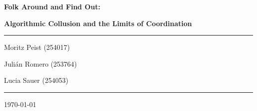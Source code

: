 \documentclass[12pt]{article}
\begin{document}
\begin{titlepage}
	\centering
	\par\vspace{1cm}
	{\huge\bfseries Folk Around and Find Out:\par}
    {\large\bfseries Algorithmic Collusion and the Limits of Coordination\par}
	\vspace{1cm}
    \noindent\rule{\textwidth}{1pt}
    {\Large Moritz Peist (254017)\par}
    {\Large Julián Romero (253764)\par}
    {\Large Lucia Sauer (254053)\par}
    \noindent\rule{\textwidth}{1pt}
    \vfill
    \begin{abstract}
        \noindent
        The \emph{Folk Theorem} establishes that collusion can be sustained in repeated interactions, yet empirical evidence suggests coordination becomes more difficult as market participants increase. This thesis presents the first test of whether Large Language Model (LLM) agents exhibit this pattern. In controlled experiments with 2-5 competing agents, we find LLM coordination erodes predictably with competition. Our results show a 3.7\% reduction in equilibrium price for each additional firm (p < 0.001), with prices declining smoothly. This culminates in a 10.6\% total price reduction from duopoly to five-agent markets, providing quantitative evidence on algorithmic collusion boundaries in the AI era.
    \end{abstract}
	\vfill
	{\large \today\par}
\end{titlepage}

\tableofcontents
\thispagestyle{empty}

\newpage
\addtocounter{page}{-1}







\newpage
\printbibliography[heading=bibintoc,title={References}]

\newpage

\end{document}
